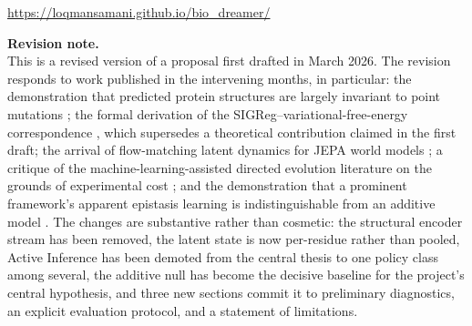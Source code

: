 \documentclass[12pt, a4paper]{article}
\begin{document}
\vspace{0.3em}
\begin{center}
\url{https://loqmansamani.github.io/bio_dreamer/}
\end{center}

\vspace{1.5cm}

\noindent\textbf{Revision note.}\\[0.4em]
\noindent This is a revised version of a proposal first drafted in March 2026. The revision responds to work published in the intervening months, in particular: the demonstration that predicted protein structures are largely invariant to point mutations \citep{feldman2026invariance}; the formal derivation of the SIGReg--variational-free-energy correspondence \citep{arnez2026sigregfree}, which supersedes a theoretical contribution claimed in the first draft; the arrival of flow-matching latent dynamics for JEPA world models \citep{huo2026flowjepa, porcher2026flowwm}; a critique of the machine-learning-assisted directed evolution literature on the grounds of experimental cost \citep{wittmann2026retrospective}; and the demonstration that a prominent framework's apparent epistasis learning is indistinguishable from an additive model \citep{visani2026additive}. The changes are substantive rather than cosmetic: the structural encoder stream has been removed, the latent state is now per-residue rather than pooled, Active Inference has been demoted from the central thesis to one policy class among several, the additive null has become the decisive baseline for the project's central hypothesis, and three new sections commit it to preliminary diagnostics, an explicit evaluation protocol, and a statement of limitations.

\newpage

\tableofcontents
\newpage
\end{document}
